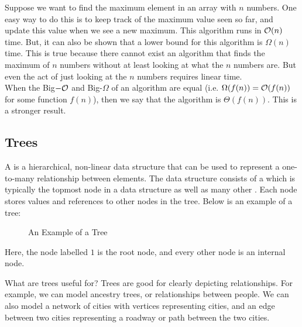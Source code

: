 \noindent Suppose we want to find the maximum element in an array with $n$ numbers. One easy way to do this is to keep track of the maximum value seen so far, and update this value when we see a new maximum. This algorithm runs in $\mathcal{O}(n)$ time. But, it can also be shown that a lower bound for this algorithm is $\Omega(n)$ time. This is true because there cannot exist an algorithm that finds the maximum of $n$ numbers without at least looking at what the $n$ numbers are. But even the act of just looking at the $n$ numbers requires linear time. \\

When the Big$-\mathcal{O}$ and Big-$\Omega$ of an algorithm are equal (i.e. $\Omega(f(n)) = \mathcal{O}(f(n))$ for some function $f(n)$), then we say that the algorithm is $\Theta(f(n))$. This is a stronger result. 


\subsection{Trees}
A  is a hierarchical, non-linear data structure that can be used to represent a one-to-many relationship between elements. The data structure consists of a  which is typically the topmost node in a data structure as well as many other . Each node stores values and references to other nodes in the tree. Below is an example of a tree:

\begin{figure}[h]
\centering
{}
\caption{An Example of a Tree}
\end{figure}

Here, the node labelled $1$ is the root node, and every other node is an internal node. 

What are trees useful for? Trees are good for clearly depicting relationships. For example, we can model ancestry trees, or relationships between people. We can also model a network of cities with vertices representing cities, and an edge between two cities representing a roadway or path between the two cities.

